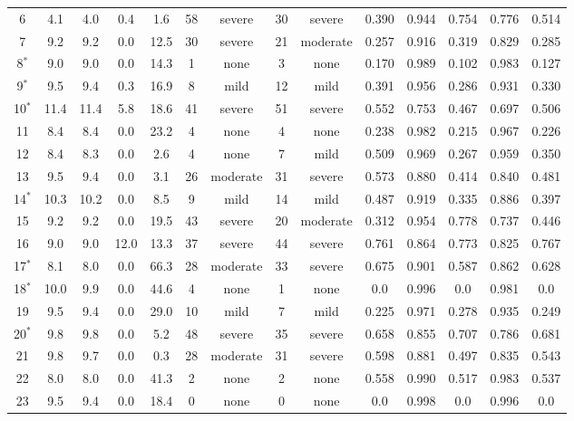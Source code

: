 \documentclass[5p,twocolumn,lefttitle]{elsarticle}
\begin{document}
\begin{table*}[tb]
{\begin{tabular}{c|cccccc|ccccccc}
6      & 4.1  & 4.0 & 0.4 & 1.6 & 58 & severe   & 30 & severe   & 0.390 & 0.944 & 0.754 & 0.776 & 0.514 \\
7      & 9.2  & 9.2 & 0.0 & 12.5 & 30 & severe   & 21 & moderate & 0.257 & 0.916 & 0.319 & 0.829 & 0.285 \\
8$^*$  & 9.0  & 9.0 & 0.0 & 14.3 & 1  & none     & 3  & none     & 0.170 & 0.989 & 0.102 & 0.983 & 0.127 \\
9$^*$  & 9.5  & 9.4 & 0.3 & 16.9 & 8  & mild     & 12 & mild     & 0.391 & 0.956 & 0.286 & 0.931 & 0.330 \\
10$^*$ & 11.4 & 11.4 & 5.8 & 18.6 & 41 & severe   & 51 & severe   & 0.552 & 0.753 & 0.467 & 0.697 & 0.506 \\
11     & 8.4  & 8.4 & 0.0 & 23.2 & 4  & none     & 4  & none     & 0.238 & 0.982 & 0.215 & 0.967 & 0.226 \\
12     & 8.4  & 8.3 & 0.0 & 2.6 & 4  & none     & 7  & mild     & 0.509 & 0.969 & 0.267 & 0.959 & 0.350 \\
13     & 9.5  & 9.4 & 0.0 & 3.1 & 26 & moderate & 31 & severe   & 0.573 & 0.880 & 0.414 & 0.840 & 0.481 \\
14$^*$ & 10.3 & 10.2 & 0.0 & 8.5 & 9  & mild     & 14 & mild     & 0.487 & 0.919 & 0.335 & 0.886 & 0.397 \\
15     & 9.2  & 9.2 & 0.0 & 19.5 & 43 & severe   & 20 & moderate & 0.312 & 0.954 & 0.778 & 0.737 & 0.446 \\
16     & 9.0  & 9.0 & 12.0 & 13.3 & 37 & severe   & 44 & severe   & 0.761 & 0.864 & 0.773 & 0.825 & 0.767 \\
17$^*$ & 8.1  & 8.0 & 0.0 & 66.3 & 28 & moderate & 33 & severe   & 0.675 & 0.901 & 0.587 & 0.862 & 0.628 \\
18$^*$ & 10.0 & 9.9 & 0.0 & 44.6 & 4  & none     & 1  & none     & 0.0   & 0.996 & 0.0   & 0.981 & 0.0   \\
19     & 9.5  & 9.4 & 0.0 & 29.0 & 10 & mild     & 7  & mild     & 0.225 & 0.971 & 0.278 & 0.935 & 0.249 \\
20$^*$ & 9.8  & 9.8 & 0.0 & 5.2 & 48 & severe   & 35 & severe   & 0.658 & 0.855 & 0.707 & 0.786 & 0.681 \\
21     & 9.8  & 9.7 & 0.0 & 0.3 & 28 & moderate & 31 & severe   & 0.598 & 0.881 & 0.497 & 0.835 & 0.543 \\
22     & 8.0  & 8.0 & 0.0 & 41.3 & 2  & none     & 2  & none     & 0.558 & 0.990 & 0.517 & 0.983 & 0.537 \\
23     & 9.5  & 9.4 & 0.0 & 18.4 & 0  & none     & 0  & none     & 0.0   & 0.998 & 0.0   & 0.996 & 0.0   \\

\end{tabular}}
\end{table*}
\end{document}
